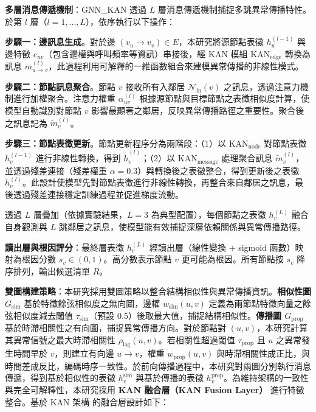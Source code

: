 \documentclass[10pt,a4paper,twocolumn]{article}
\begin{document}
\textbf{多層消息傳遞機制}：GNN\_KAN 透過 $L$ 層消息傳遞機制捕捉多跳異常傳播特性。於第 $l$ 層（$l = 1, ..., L$），依序執行以下操作：

\textbf{步驟一：邊訊息生成}。對於邊 $(v_u \to v_v) \in E$，本研究將源節點表徵 $h_u^{(l-1)}$ 與邊特徵 $e_{uv}$（包含邊權與呼叫頻率等資訊）串接後，經 KAN 模組 $\text{KAN}_{\text{edge}}$ 轉換為訊息 $m_{u \to v}^{(l)}$，此過程利用可解釋的一維函數組合來建模異常傳播的非線性模式。

\textbf{步驟二：節點訊息聚合}。節點 $v$ 接收所有入鄰居 $\mathcal{N}_{\text{in}}(v)$ 之訊息，透過注意力機制進行加權聚合。注意力權重 $\alpha_{uv}^{(l)}$ 根據源節點與目標節點之表徵相似度計算，使模型自動識別對節點 $v$ 影響最顯著之鄰居，反映異常傳播路徑之重要性。聚合後之訊息記為 $\tilde{m}_v^{(l)}$。

\textbf{步驟三：節點表徵更新}。節點更新程序分為兩階段：（1）以 $\text{KAN}_{\text{node}}$ 對節點表徵 $h_v^{(l-1)}$ 進行非線性轉換，得到 $\tilde{h}_v^{(l)}$；（2）以 $\text{KAN}_{\text{message}}$ 處理聚合訊息 $\tilde{m}_v^{(l)}$，並透過殘差連接（殘差權重 $\alpha=0.3$）與轉換後之表徵整合，得到更新後之表徵 $h_v^{(l)}$。此設計使模型先對節點表徵進行非線性轉換，再整合來自鄰居之訊息，最後透過殘差連接穩定訓練過程並促進梯度流動。

透過 $L$ 層疊加（依據實驗結果，$L=3$ 為典型配置），每個節點之表徵 $h_v^{(L)}$ 融合自身觀測與 $L$ 跳鄰居之訊息，使模型能有效捕捉深層依賴關係與異常傳播路徑。

\textbf{讀出層與根因評分}：最終層表徵 $h_v^{(L)}$ 經讀出層（線性變換 + sigmoid 函數）映射為根因分數 $s_v \in (0, 1)$。高分數表示節點 $v$ 更可能為根因。所有節點按 $s_v$ 降序排列，輸出候選清單 $R$。

\textbf{雙圖構建策略}：本研究採用雙圖策略以整合結構相似性與異常傳播資訊。\textbf{相似性圖 $G_{\text{sim}}$} 基於特徵餘弦相似度之無向圖，邊權 $w_{\text{sim}}(u, v)$ 定義為兩節點特徵向量之餘弦相似度減去閾值 $\tau_{\text{sim}}$（預設 0.5）後取最大值，捕捉結構相似性。\textbf{傳播圖 $G_{\text{prop}}$} 基於時滯相關性之有向圖，捕捉異常傳播方向。對於節點對 $(u, v)$，本研究計算其異常信號之最大時滯相關性 $\rho_{\text{lag}}(u, v)$。若相關性超過閾值 $\tau_{\text{prop}}$ 且 $u$ 之異常發生時間早於 $v$，則建立有向邊 $u \to v$，權重 $w_{\text{prop}}(u, v)$ 與時滯相關性成正比，與時間差成反比，編碼時序一致性。於前向傳播過程中，本研究對兩圖分別執行消息傳遞，得到基於相似性的表徵 $h_v^{\text{sim}}$ 與基於傳播的表徵 $h_v^{\text{prop}}$。為維持架構的一致性與完全可解釋性，本研究採用 \textbf{KAN 融合層（KAN Fusion Layer）} 進行特徵整合。基於 KAN 架構 \cite{kan2024} 的融合層設計如下：
\end{document}
